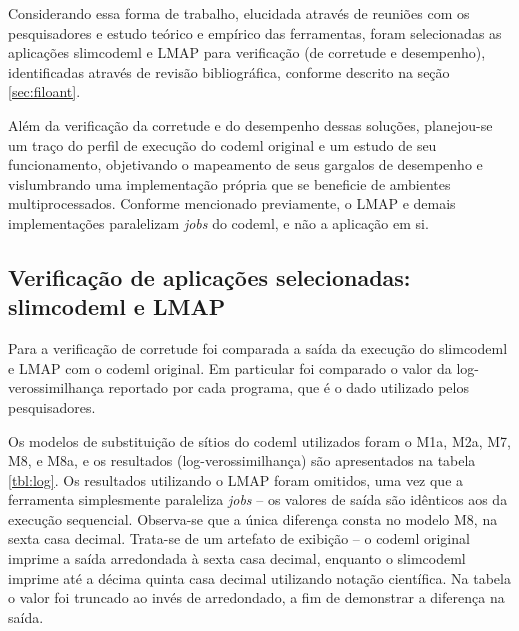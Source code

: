 \documentclass[cic,tc]{iiufrgs}
\begin{document}
Considerando essa forma de trabalho, elucidada através de reuniões com os
pesquisadores e estudo teórico e empírico das ferramentas, foram selecionadas
as aplicações slimcodeml e LMAP para verificação (de corretude e desempenho),
identificadas através de revisão bibliográfica, conforme descrito na seção
\ref{sec:filoant}.

Além da verificação da corretude e do desempenho dessas soluções, planejou-se
um traço do perfil de execução do codeml original e um estudo de seu
funcionamento, objetivando o mapeamento de seus gargalos de desempenho e
vislumbrando uma implementação própria que se beneficie de ambientes
multiprocessados. Conforme mencionado previamente, o LMAP e demais
implementações paralelizam \textit{jobs} do codeml, e não a aplicação em si. 

\subsection{Verificação de aplicações selecionadas: slimcodeml e LMAP}

Para a verificação de corretude foi comparada a saída da execução do slimcodeml
e LMAP com o codeml original. Em particular foi comparado o valor da
log-verossimilhança reportado por cada programa, que é o dado utilizado pelos
pesquisadores.

Os modelos de substituição de sítios do codeml utilizados foram o M1a, M2a, M7,
M8, e M8a, e os resultados (log-verossimilhança) são apresentados na tabela
\ref{tbl:log}. Os resultados utilizando o LMAP foram omitidos, uma vez que a
ferramenta simplesmente paraleliza \textit{jobs} -- os valores de saída são
idênticos aos da execução sequencial. Observa-se que a única diferença consta
no modelo M8, na sexta casa decimal. Trata-se de um artefato de exibição -- o
codeml original imprime a saída arredondada à sexta casa decimal, enquanto o
slimcodeml imprime até a décima quinta casa decimal utilizando notação
científica. Na tabela o valor foi truncado ao invés de arredondado, a fim de
demonstrar a diferença na saída.
\end{document}
